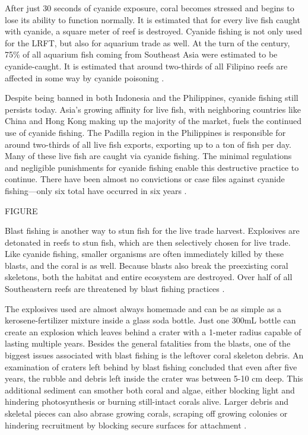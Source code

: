 \documentclass{book}\usepackage{knitr}
\begin{document}
	After just 30 seconds of cyanide exposure, coral becomes stressed and begins to lose its ability to function normally. It is estimated that for every live fish caught with cyanide, a square meter of reef is destroyed. Cyanide fishing is not only used for the LRFT, but also for aquarium trade as well. At the turn of the century, 75\% of all aquarium fish coming from Southeast Asia were estimated to be cyanide-caught. It is estimated that around two-thirds of all Filipino reefs are affected in some way by cyanide poisoning \citep{970313024119970301}.

Despite being banned in both Indonesia and the Philippines, cyanide fishing still persists today. Asia’s growing affinity for live fish, with neighboring countries like China and Hong Kong making up the majority of the market, fuels the continued use of cyanide fishing. The Padilla region in the Philippines is responsible for around two-thirds of all live fish exports, exporting up to a ton of fish per day. Many of these live fish are caught via cyanide fishing. The minimal regulations and negligible punishments for cyanide fishing enable this destructive practice to continue. There have been almost no convictions or case files against cyanide fishing—only six total have occurred in six years \citep{wwfcyanide}.

FIGURE

Blast fishing is another way to stun fish for the live trade harvest. Explosives are detonated in reefs to stun fish, which are then selectively chosen for live trade. Like cyanide fishing, smaller organisms are often immediately killed by these blasts, and the coral is as well. Because blasts also break the preexisting coral skeletons, both the habitat and entire ecosystem are destroyed.  Over half of all Southeastern reefs are threatened by blast fishing practices \citep{https://doi.org/10.1890/1051-0761(2006)016[1631:RFBFOC]2.0.CO;2}. 
  
The explosives used are almost always homemade and can be as simple as a kerosene-fertilizer mixture inside a glass soda bottle. Just one 300mL bottle can create an explosion which leaves behind a crater with a 1-meter radius capable of lasting multiple years. Besides the general fatalities from the blasts, one of the biggest issues associated with blast fishing is the leftover coral skeleton debris. An examination of craters left behind by blast fishing concluded that even after five years, the rubble and debris left inside the crater was between 5-10 cm deep. This additional sediment can smother both coral and algae, either blocking light and hindering photosynthesis or burning still-intact corals alive. Larger debris and skeletal pieces can also abrase growing corals, scraping off growing colonies or hindering recruitment by blocking secure surfaces for attachment \citep{https://doi.org/10.1890/1051-0761(2006)016[1631:RFBFOC]2.0.CO;2}. 
\end{document}
